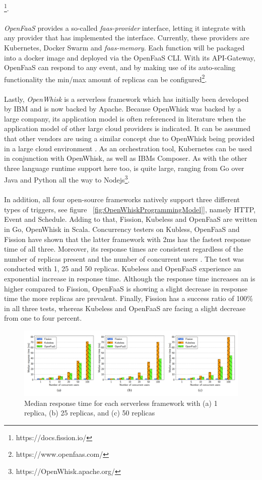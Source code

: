\documentclass[a4paper,twoside,11pt, pagesize]{scrartcl}
\begin{document}
\footnote{https://docs.fission.io/}.\\\\ \textit{OpenFaaS} provides a so-called \textit{faas-provider} interface, letting it integrate with any provider that has implemented the interface. Currently, these providers are Kubernetes, Docker Swarm and \textit{faas-memory}. Each function will be packaged into a docker image and deployed via the OpenFaaS CLI. With its API-Gateway, OpenFaaS can respond to any event, and by making use of its auto-scaling functionality the min/max amount of replicas can be configured\footnote{https://www.openfaas.com/}.\\\\ Lastly, \textit{OpenWhisk} is a serverless framework which has initially been developed by IBM and is now backed by Apache. Because OpenWhisk was backed by a large company, its application model is often referenced in literature when the application model of other large cloud providers is indicated. It can be assumed that other vendors are using a similar concept due to OpenWhisk being provided in a large cloud environment \cite{van2019spec}. As an orchestration tool, Kubernetes can be used in conjunction with OpenWhisk, as well as IBMs Composer. As with the other three language runtime support here too, is quite large, ranging from Go over Java and Python all the way to Nodejs\footnote{https://OpenWhisk.apache.org/}.\\\\ In addition,  all four open-source frameworks natively support three different types of triggers, see figure ~\ref{fig:OpenWhiskProgrammingModel}], namely HTTP, Event and Schedule. Adding to that, Fission, Kubeless and OpenFaaS are written in Go, OpenWhisk in Scala. Concurrency testers on Kubless, OpenFaaS and Fission have shown that the latter framework with 2ms has the fastest response time of all three. Moreover, its response times are consistent regardless of the number of replicas present and the number of concurrent users \cite{mohanty2018evaluation}. The test was conducted with 1, 25 and 50 replicas. Kubeless and OpenFaaS experience an exponential increase in response time. Although the response time increases an is higher compared to Fission, OpenFaaS is showing a slight decrease in response time the more replicas are prevalent. Finally, Fission has a success ratio of 100\% in all three tests, whereas Kubeless and OpenFaaS are facing a slight decrease from one to four percent.
\begin{figure}[H]
\caption{Median response time for each serverless framework with (a) 1 replica, (b) 25 replicas, and (c) 50 replicas \cite{mohanty2018evaluation}}
\label{fig:opensource}
\centering
\includegraphics[width=1\textwidth]{opensource}
\end{figure}
\end{document}
